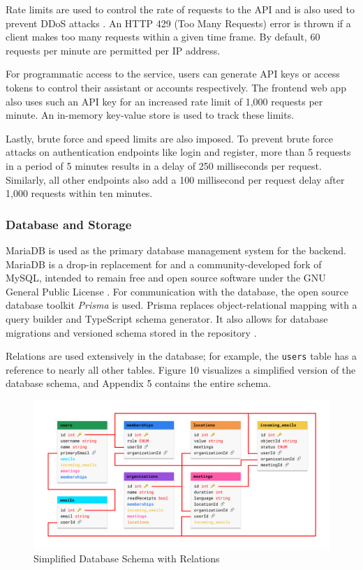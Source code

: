 \documentclass{article}
\begin{document}
Rate limits are used to control the rate of requests to the API and is also used to prevent DDoS attacks \cite{noauthor_rate_nodate}. An HTTP 429 (Too Many Requests) error is thrown if a client makes too many requests within a given time frame. By default, 60 requests per minute are permitted per IP address.

For programmatic access to the service, users can generate API keys or access tokens to control their assistant or accounts respectively. The frontend web app also uses such an API key for an increased rate limit of 1,000 requests per minute. An in-memory key-value store is used to track these limits.

Lastly, brute force and speed limits are also imposed. To prevent brute force attacks on authentication endpoints like login and register, more than 5 requests in a period of 5 minutes results in a delay of 250 milliseconds per request. Similarly, all other endpoints also add a 100 millisecond per request delay after 1,000 requests within ten minutes.

\subsubsection{Database and Storage}

MariaDB is used as the primary database management system for the backend. MariaDB is a drop-in replacement for and a community-developed fork of MySQL, intended to remain free and open source software under the GNU General Public License \cite{noauthor_mariadb/server_2020}. For communication with the database, the open source database toolkit \emph{Prisma} is used. Prisma replaces object-relational mapping with a query builder and TypeScript schema generator. It also allows for database migrations and versioned schema stored in the repository \cite{noauthor_prisma/prisma_2020}.

Relations are used extensively in the database; for example, the \texttt{users} table has a reference to nearly all other tables. Figure 10 visualizes a simplified version of the database schema, and Appendix 5 contains the entire schema.

\begin{figure}[h]
	\includegraphics[width=\textwidth]{database-basic.png}
	\caption{Simplified Database Schema with Relations}
\end{figure}
\end{document}
